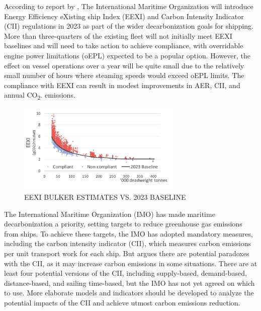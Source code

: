 According to report by \citeauthor{stevenson_2021_bulker} \autocite{stevenson_2021_bulker}, The International Maritime Organization will introduce Energy Efficiency eXisting ship Index (EEXI) and Carbon Intensity Indicator (CII) regulations in 2023 as part of the wider decarbonization goals for shipping. More than three-quarters of the existing fleet will not initially meet EEXI baselines and will need to take action to achieve compliance, with overridable engine power limitations (oEPL) expected to be a popular option. However, the effect on vessel operations over a year will be quite small due to the relatively small number of hours where steaming speeds would exceed oEPL limits. The compliance with EEXI can result in modest improvements in AER, CII, and annual CO\textsubscript{2}. emissions.

\begin{figure}[h]
    \centering
    \includegraphics[width=0.7\textwidth]{images/eexi_non_compliant.png}
    \caption{EEXI BULKER ESTIMATES VS. 2023 BASELINE}
    \label{eexiNonCompliant}
\end{figure}


The International Maritime Organization (IMO) has made maritime decarbonization a priority, setting targets to reduce greenhouse gas emissions from ships.
To achieve these targets, the IMO has adopted mandatory measures, including the carbon intensity indicator (CII), which measures carbon emissions per unit transport work for each ship.
But \citeauthor{WANG2021100005} \autocite{WANG2021100005} argues there are potential paradoxes with the CII, as it may increase carbon emissions in some situations.
There are at least four potential versions of the CII, including supply-based, demand-based, distance-based, and sailing time-based, but the IMO has not yet agreed on which to use.
More elaborate models and indicators should be developed to analyze the potential impacts of the CII and achieve utmost carbon emissions reduction.

